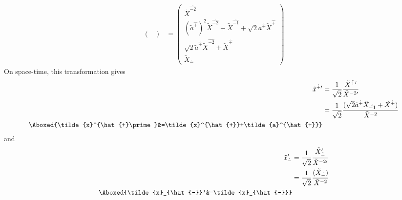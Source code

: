 \documentclass[]{article}
\numberwithin{equation}{section}
\begin{document}
{{\begin{align}
\begin{pmatrix}
    \end{pmatrix}&= \begin{pmatrix}
        \tilde{X}^{\hat{-2}}\\
        (\tilde{a}^{\hat{+}})^2\tilde{X}^{\hat{-2}}+\tilde{X}^{\hat{-1}}+\sqrt{2}a^{\hat{+}}\tilde{X}^{\hat{+}}\\
        \sqrt{2}\tilde{a}^{\hat{+}}\tilde{X}^{\hat{-2}}+\tilde{X}^{\hat{+}}\\
        \tilde{X}_{\hat{-}}
    \end{pmatrix}
\end{align}
On space-time, this transformation gives
\begin{align}
    \tilde{x}^{\hat{+}\prime}&=\frac{1}{\sqrt{2}}\frac{\tilde{X}^{{\hat{+}}\prime}}{ \tilde{X}^{-2\prime}}\\
    &=\frac{1}{\sqrt{2}}\frac{(\sqrt{2}\tilde{a}^{\hat{+}}\tilde{X}_{\hat{-1}}+\tilde{X}^{\hat{+}})}{\tilde{X}^{-2}}\\
    \Aboxed{\tilde{x}^{\hat{+}\prime}&=\tilde{x}^{\hat{+}}+\tilde{a}^{\hat{+}}}
\end{align}
and
\begin{align}
    \tilde{x}_{\hat{-}}'&=\frac{1}{\sqrt{2}}\frac{\tilde{X}_{{\hat{-}}}^{\prime}}{ \tilde{X}^{-2\prime}}\\
    &=\frac{1}{\sqrt{2}}\frac{(\tilde{X}_{\hat{-}})}{\tilde{X}^{-2}}\\
    \Aboxed{\tilde{x}_{\hat{-}}'&=\tilde{x}_{\hat{-}}}
\end{align}
}}
\end{document}
